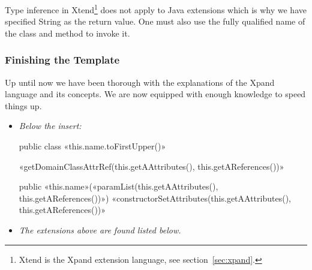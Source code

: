 Type inference in Xtend\footnote{Xtend is the Xpand extension language, see section~\ref{sec:xpand}.} does not apply to Java extensions which is why we have specified String as the return value. One must also use the fully qualified name of the class and method to invoke it.

\subsubsection{Finishing the Template}
Up until now we have been thorough with the explanations of the Xpand language and its concepts. We are now equipped with enough knowledge to speed things up.

\begin{itemize}
  \item \emph{Below the  insert:}
  \begin{plainlisting}
public class «this.name.toFirstUpper()» {                                                                             
    «getDomainClassAttrRef(this.getAAttributes(), this.getAReferences())»                                                                                                                                                                 
                           
    public «this.name»(«paramList(this.getAAttributes(), this.getAReferences())») {                                             
	«constructorSetAttributes(this.getAAttributes(), this.getAReferences())»                                            
    }   
}        
  \end{plainlisting}
  \item \emph{The extensions above are found listed below.}
\end{itemize}

